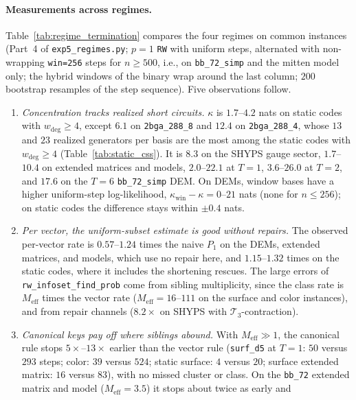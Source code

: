 \documentclass[12pt]{article}
\theoremstyle{definition}
\newcommand{\Tc}{\mathcal{T}_3}
\newcommand{\ttt}[1]{\texttt{#1}}
\begin{document}
\paragraph{Measurements across regimes.}
Table~\ref{tab:regime_termination} compares the four regimes on common instances (Part~4 of \ttt{exp5\_regimes.py};
$p = 1$ \ttt{RW} with uniform steps, alternated with non-wrapping \ttt{win=256} steps for $n \ge 500$, i.e., on
\ttt{bb\_72\_simp} and the mitten model only; the hybrid windows of the binary wrap around the last column; $200$
bootstrap resamples of the step sequence). Five observations follow.
\begin{enumerate}[label=(\arabic*)]
  \item \emph{Concentration tracks realized short circuits.} $\kappa$ is $1.7$--$4.2$ nats on static codes with
    $w_{\deg} \ge 4$, except $6.1$ on \ttt{2bga\_288\_8} and $12.4$ on \ttt{2bga\_288\_4}, whose $13$ and $23$ realized
    generators per basis are the most among the static codes with $w_{\deg} \ge 4$ (Table~\ref{tab:static_css}). It is
    $8.3$ on the SHYPS gauge sector, $1.7$--$10.4$ on extended matrices and models, $2.0$--$22.1$ at $T = 1$,
    $3.6$--$26.0$ at $T = 2$, and $17.6$ on the $T = 6$ \ttt{bb\_72\_simp} DEM. On DEMs, window bases have a higher
    uniform-step log-likelihood, $\kappa_{\mathrm{win}} - \kappa = 0$--$21$ nats (none for $n \le 256$); on static
    codes the difference stays within $\pm 0.4$ nats.
  \item \emph{Per vector, the uniform-subset estimate is good without repairs.} The observed per-vector rate is
    $0.57$--$1.24$ times the naive $P_1$ on the DEMs, extended matrices, and models, which use no repair here, and
    $1.15$--$1.32$ times on the static codes, where it includes the shortening rescues. The large errors of
    \ttt{rw\_infoset\_find\_prob} come from sibling multiplicity, since the class rate is $M_{\mathrm{eff}}$ times the
    vector rate ($M_{\mathrm{eff}} = 16$--$111$ on the surface and color instances), and from repair channels
    ($8.2\times$ on SHYPS with $\Tc$-contraction).
  \item \emph{Canonical keys pay off where siblings abound.} With $M_{\mathrm{eff}} \gg 1$, the canonical rule stops
    $5\times$--$13\times$ earlier than the vector rule (\ttt{surf\_d5} at $T = 1$: $50$ versus $293$ steps; color: $39$
    versus $524$; static surface: $4$ versus $20$; surface extended matrix: $16$ versus $83$), with no missed cluster or
    class. On the \ttt{bb\_72} extended matrix and model ($M_{\mathrm{eff}} = 3.5$) it stops about twice as early and

\end{enumerate}
\end{document}
